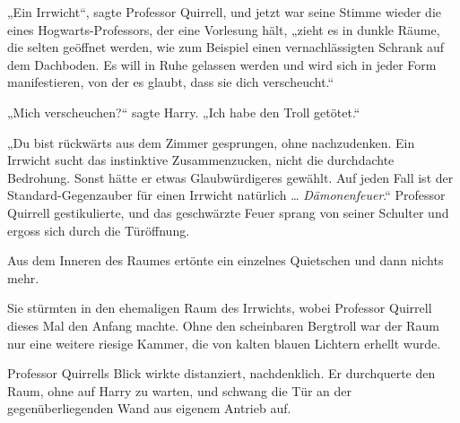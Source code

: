 „Ein Irrwicht“, sagte Professor Quirrell, und jetzt war seine Stimme wieder die eines Hogwarts-Professors, der eine Vorlesung hält, „zieht es in dunkle Räume, die selten geöffnet werden, wie zum Beispiel einen vernachlässigten Schrank auf dem Dachboden. Es will in Ruhe gelassen werden und wird sich in jeder Form manifestieren, von der es glaubt, dass sie dich verscheucht.“

„Mich verscheuchen?“ sagte Harry.
„Ich habe den Troll getötet.“

„Du bist rückwärts aus dem Zimmer gesprungen, ohne nachzudenken. Ein Irrwicht sucht das instinktive Zusammenzucken, nicht die durchdachte Bedrohung. Sonst hätte er etwas Glaubwürdigeres gewählt. Auf jeden Fall ist der Standard-Gegenzauber für einen Irrwicht natürlich … \emph{Dämonenfeuer}.“
Professor Quirrell gestikulierte, und das geschwärzte Feuer sprang von seiner Schulter und ergoss sich durch die Türöffnung.

Aus dem Inneren des Raumes ertönte ein einzelnes Quietschen und dann nichts mehr.

Sie stürmten in den ehemaligen Raum des Irrwichts, wobei Professor Quirrell dieses Mal den Anfang machte. Ohne den scheinbaren Bergtroll war der Raum nur eine weitere riesige Kammer, die von kalten blauen Lichtern erhellt wurde.

Professor Quirrells Blick wirkte distanziert, nachdenklich. Er durchquerte den Raum, ohne auf Harry zu warten, und schwang die Tür an der gegenüberliegenden Wand aus eigenem Antrieb auf.

